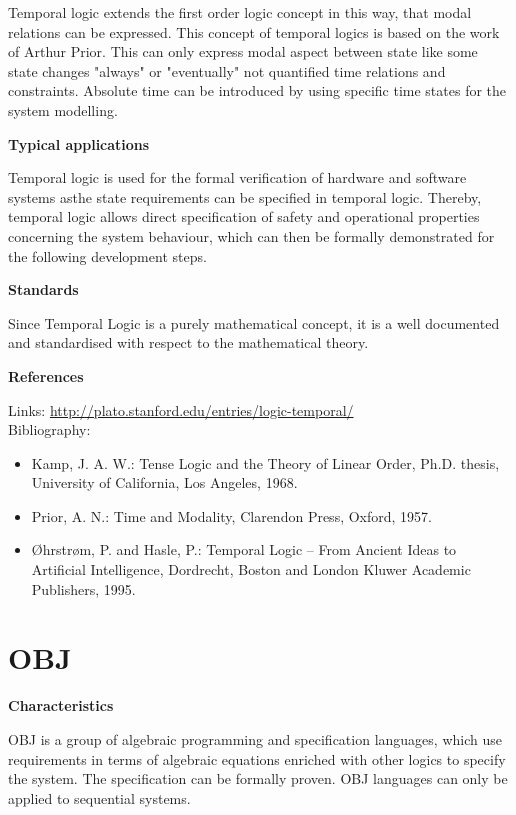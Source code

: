 \documentclass{./template/openetcs_report}
\begin{document}
Temporal logic extends the first order logic concept in this way, that modal relations can be expressed. This concept of temporal logics is based on the work of Arthur Prior. This can only express modal aspect between state like some state changes "always" or "eventually" not quantified time relations and constraints. Absolute time can be introduced by using specific time states for the system modelling.



	\textbf{Typical applications}

Temporal logic is used for the formal verification of hardware and software systems asthe state requirements can be specified in temporal logic. Thereby, temporal logic allows direct specification of safety and operational properties concerning the system behaviour, which can then be formally demonstrated for the following development steps.

	\textbf{Standards}

Since Temporal Logic is a purely mathematical concept, it is a well documented and standardised with respect to the mathematical theory.


	\textbf{References}

Links:
\url{http://plato.stanford.edu/entries/logic-temporal/} \\[4pt]

Bibliography:

\begin{itemize}
\item Kamp, J. A. W.: Tense Logic and the Theory of Linear Order, Ph.D. thesis, University of California, Los Angeles, 1968.
\item Prior, A. N.: Time and Modality, Clarendon Press, Oxford, 1957.
\item Øhrstrøm, P. and Hasle, P.: Temporal Logic -- From Ancient Ideas to Artificial Intelligence, Dordrecht, Boston and London Kluwer Academic Publishers, 1995.
\end{itemize}




\section{OBJ}


	\textbf{Characteristics}

 OBJ is a group of algebraic programming and specification languages, which use requirements in terms of algebraic equations enriched with other logics to specify the system. The specification can be formally proven. OBJ languages can only be applied to sequential systems.
 
\end{document}

